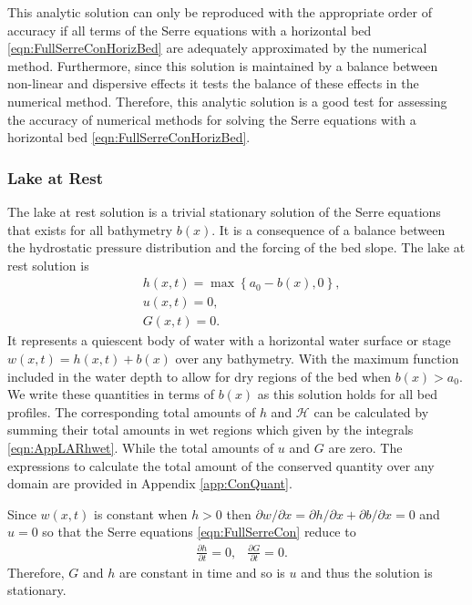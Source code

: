 This analytic solution can only be reproduced with the appropriate order of accuracy if all terms of the Serre equations with a horizontal bed \eqref{eqn:FullSerreConHorizBed} are adequately approximated by the numerical method. Furthermore, since this solution is maintained by a balance between non-linear and dispersive effects it tests the balance of these effects in the numerical method. Therefore, this analytic solution is a good test for assessing the accuracy of numerical methods for solving the Serre equations with a horizontal bed \eqref{eqn:FullSerreConHorizBed}.

\subsubsection{Lake at Rest}
The lake at rest solution is a trivial stationary solution of the Serre equations that exists for all bathymetry $b(x)$. It is a consequence of a balance between the hydrostatic pressure distribution and the forcing of the bed slope. The lake at rest solution is
\begin{subequations}
	\begin{align}
	&h(x,t) = \max\left\lbrace a_0 - b(x), 0 \right\rbrace, \\
	&u(x,t) = 0 , \\
	&G(x,t) = 0 .
	\end{align}
	\label{eqn:LARdefhub}
\end{subequations}
It represents a quiescent body of water with a horizontal water surface or stage $w(x,t) = h(x,t) + b(x)$ over any bathymetry. With the maximum function included in the water depth to allow for dry regions of the bed when $b(x) > a_0$. We write these quantities in terms of $b(x)$ as this solution holds for all bed profiles. The corresponding total amounts of $h$ and $\mathcal{H}$ can be calculated by summing their total amounts in wet regions which given by the integrals \eqref{eqn:AppLARhwet}. While the total amounts of $u$ and $G$ are zero. The expressions to calculate the total amount of the conserved quantity over any domain are provided in Appendix \ref{app:ConQuant}. 

Since $w(x,t)$ is constant when $h> 0$ then $\partial w / \partial x = \partial h / \partial x + \partial b / \partial x = 0 $ and $u=0$ so that the Serre equations \eqref{eqn:FullSerreCon} reduce to
\begin{align*}
& \frac{\partial h}{\partial t}  = 0,  &\frac{\partial G}{\partial t}  = 0.
\end{align*}
Therefore, $G$ and $h$ are constant in time and so is $u$ and thus the solution is stationary.

